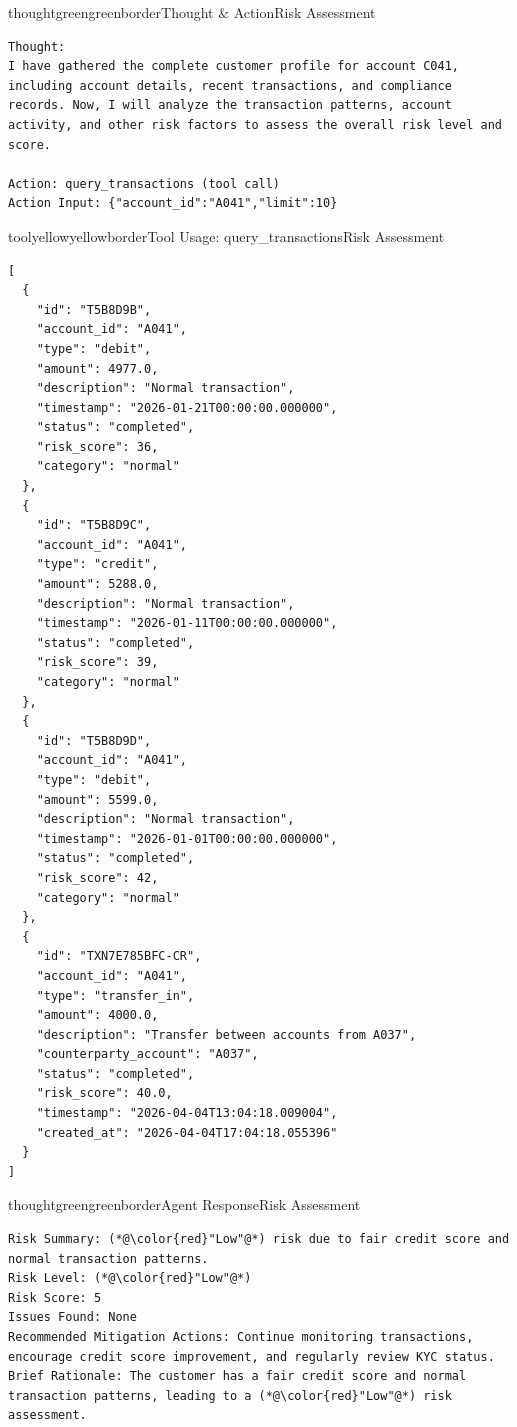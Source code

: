 \begin{agentbox}{thoughtgreen}{greenborder}{Thought \& Action}{Risk Assessment}
\begin{lstlisting}[style=myprompt]
Thought: 
I have gathered the complete customer profile for account C041, including account details, recent transactions, and compliance records. Now, I will analyze the transaction patterns, account activity, and other risk factors to assess the overall risk level and score.

Action: query_transactions (tool call)
Action Input: {"account_id":"A041","limit":10}
\end{lstlisting}
\end{agentbox}


\begin{agentbox}{toolyellow}{yellowborder}{Tool Usage: query\_transactions}{Risk Assessment}
\begin{lstlisting}[style=myprompt]
[
  {
    "id": "T5B8D9B",
    "account_id": "A041",
    "type": "debit",
    "amount": 4977.0,
    "description": "Normal transaction",
    "timestamp": "2026-01-21T00:00:00.000000",
    "status": "completed",
    "risk_score": 36,
    "category": "normal"
  },
  {
    "id": "T5B8D9C",
    "account_id": "A041",
    "type": "credit",
    "amount": 5288.0,
    "description": "Normal transaction",
    "timestamp": "2026-01-11T00:00:00.000000",
    "status": "completed",
    "risk_score": 39,
    "category": "normal"
  },
  {
    "id": "T5B8D9D",
    "account_id": "A041",
    "type": "debit",
    "amount": 5599.0,
    "description": "Normal transaction",
    "timestamp": "2026-01-01T00:00:00.000000",
    "status": "completed",
    "risk_score": 42,
    "category": "normal"
  },
  {
    "id": "TXN7E785BFC-CR",
    "account_id": "A041",
    "type": "transfer_in",
    "amount": 4000.0,
    "description": "Transfer between accounts from A037",
    "counterparty_account": "A037",
    "status": "completed",
    "risk_score": 40.0,
    "timestamp": "2026-04-04T13:04:18.009004",
    "created_at": "2026-04-04T17:04:18.055396"
  }
]

\end{lstlisting}
\end{agentbox}

\begin{agentbox}{thoughtgreen}{greenborder}{Agent Response}{Risk Assessment}
\begin{lstlisting}[style=myprompt]
Risk Summary: (*@\color{red}"Low"@*) risk due to fair credit score and normal transaction patterns.
Risk Level: (*@\color{red}"Low"@*)
Risk Score: 5
Issues Found: None
Recommended Mitigation Actions: Continue monitoring transactions, encourage credit score improvement, and regularly review KYC status.
Brief Rationale: The customer has a fair credit score and normal transaction patterns, leading to a (*@\color{red}"Low"@*) risk assessment.
\end{lstlisting}
\end{agentbox}

